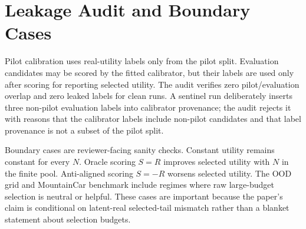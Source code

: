 \documentclass{article}
\begin{document}
\section{Leakage Audit and Boundary Cases}

Pilot calibration uses real-utility labels only from the pilot split. Evaluation candidates may be scored by the fitted calibrator, but their labels are used only after scoring for reporting selected utility. The audit verifies zero pilot/evaluation overlap and zero leaked labels for clean runs. A sentinel run deliberately inserts three non-pilot evaluation labels into calibrator provenance; the audit rejects it with reasons that the calibrator labels include non-pilot candidates and that label provenance is not a subset of the pilot split.

Boundary cases are reviewer-facing sanity checks. Constant utility remains constant for every \(N\). Oracle scoring \(S=R\) improves selected utility with \(N\) in the finite pool. Anti-aligned scoring \(S=-R\) worsens selected utility. The OOD grid and MountainCar benchmark include regimes where raw large-budget selection is neutral or helpful. These cases are important because the paper's claim is conditional on latent-real selected-tail mismatch rather than a blanket statement about selection budgets.
\end{document}
